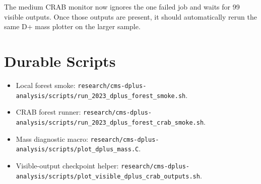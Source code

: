 \documentclass[10pt]{article}
\begin{document}
The medium CRAB monitor now ignores the one failed job and waits for 99 visible
outputs. Once those outputs are present, it should automatically rerun the same
D+ mass plotter on the larger sample.

\section*{Durable Scripts}

\begin{itemize}
\item Local forest smoke:
\texttt{research/cms-dplus-analysis/scripts/run\_2023\_dplus\_forest\_smoke.sh}.
\item CRAB forest runner:
\texttt{research/cms-dplus-analysis/scripts/run\_2023\_dplus\_forest\_crab\_smoke.sh}.
\item Mass diagnostic macro:
\texttt{research/cms-dplus-analysis/scripts/plot\_dplus\_mass.C}.
\item Visible-output checkpoint helper:
\texttt{research/cms-dplus-analysis/scripts/plot\_visible\_dplus\_crab\_outputs.sh}.
\end{itemize}
\end{document}
